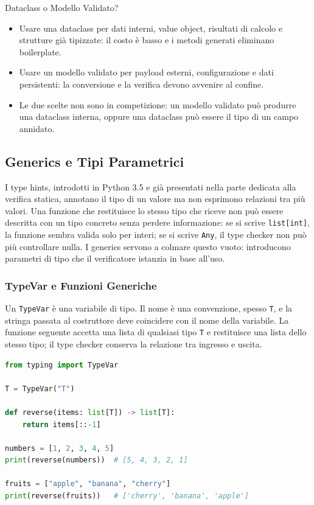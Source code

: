 \documentclass[12pt]{extarticle}
\begin{document}
\begin{cbox}{Dataclass o Modello Validato?}
\begin{itemize}
    \item Usare una dataclass per dati interni, value object, risultati di calcolo e strutture già tipizzate: il costo è basso e i metodi generati eliminano boilerplate.
    \item Usare un modello validato per payload esterni, configurazione e dati persistenti: la conversione e la verifica devono avvenire al confine.
    \item Le due scelte non sono in competizione: un modello validato può produrre una dataclass interna, oppure una dataclass può essere il tipo di un campo annidato.
\end{itemize}
\end{cbox}

\subsection{Generics e Tipi Parametrici}

\noindent I type hints, introdotti in Python 3.5 e già presentati nella parte dedicata alla verifica statica, annotano il tipo di un valore ma non esprimono relazioni tra più valori. Una funzione che restituisce lo stesso tipo che riceve non può essere descritta con un tipo concreto senza perdere informazione: se si scrive \texttt{list[int]}, la funzione sembra valida solo per interi; se si scrive \texttt{Any}, il type checker non può più controllare nulla. I generics servono a colmare questo vuoto: introducono parametri di tipo che il verificatore istanzia in base all'uso.

\subsubsection{TypeVar e Funzioni Generiche}

\noindent Un \texttt{TypeVar} è una variabile di tipo. Il nome è una convenzione, spesso \texttt{T}, e la stringa passata al costruttore deve coincidere con il nome della variabile. La funzione seguente accetta una lista di qualsiasi tipo \texttt{T} e restituisce una lista dello stesso tipo; il type checker conserva la relazione tra ingresso e uscita.

\begin{lstlisting}[language=Python]
from typing import TypeVar

T = TypeVar("T")

def reverse(items: list[T]) -> list[T]:
    return items[::-1]

numbers = [1, 2, 3, 4, 5]
print(reverse(numbers))  # [5, 4, 3, 2, 1]

fruits = ["apple", "banana", "cherry"]
print(reverse(fruits))   # ['cherry', 'banana', 'apple']
\end{lstlisting}
\end{document}
